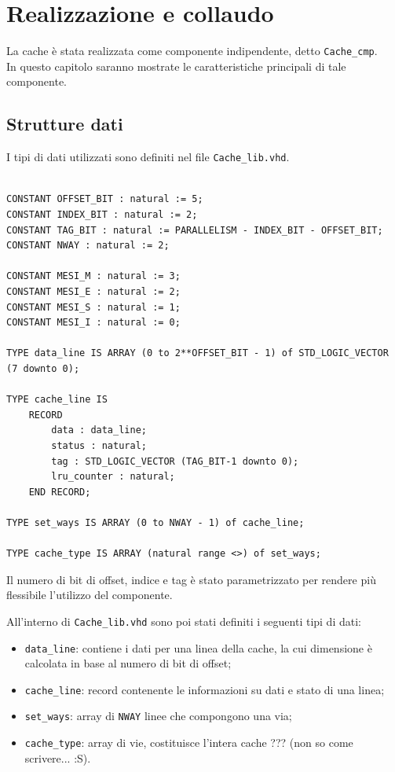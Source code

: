 \clearpage{\pagestyle{empty}\cleardoublepage}

\chapter{Realizzazione e collaudo}

La cache \`e stata realizzata come componente indipendente, detto \texttt{Cache\_cmp}.\\
In questo capitolo saranno mostrate le caratteristiche principali di tale componente.

\section{Strutture dati}

I tipi di dati utilizzati sono definiti nel file \texttt{Cache\_lib.vhd}.


\begin{lstlisting}

CONSTANT OFFSET_BIT : natural := 5;
CONSTANT INDEX_BIT : natural := 2;
CONSTANT TAG_BIT : natural := PARALLELISM - INDEX_BIT - OFFSET_BIT;
CONSTANT NWAY : natural := 2;

CONSTANT MESI_M : natural := 3;
CONSTANT MESI_E : natural := 2;
CONSTANT MESI_S : natural := 1;
CONSTANT MESI_I : natural := 0;

TYPE data_line IS ARRAY (0 to 2**OFFSET_BIT - 1) of STD_LOGIC_VECTOR (7 downto 0);

TYPE cache_line IS 
	RECORD
		data : data_line;
		status : natural;
		tag : STD_LOGIC_VECTOR (TAG_BIT-1 downto 0);
		lru_counter : natural;
	END RECORD;

TYPE set_ways IS ARRAY (0 to NWAY - 1) of cache_line;
		
TYPE cache_type IS ARRAY (natural range <>) of set_ways;
\end{lstlisting}


Il numero di bit di offset, indice e tag \`e stato parametrizzato per rendere pi\`u flessibile l'utilizzo del componente.

All'interno di \texttt{Cache\_lib.vhd} sono poi stati definiti i seguenti tipi di dati:
\begin{itemize}
  \item \texttt{data\_line}: contiene i dati per una linea della cache, la cui dimensione \`e calcolata in base al numero di bit di offset;
  \item \texttt{cache\_line}: record contenente le informazioni su dati e stato di una linea;
  \item \texttt{set\_ways}: array di \texttt{NWAY} linee che compongono una via;
  \item \texttt{cache\_type}: array di vie, costituisce l'intera cache ??? (non so come scrivere... :S).
\end{itemize}

